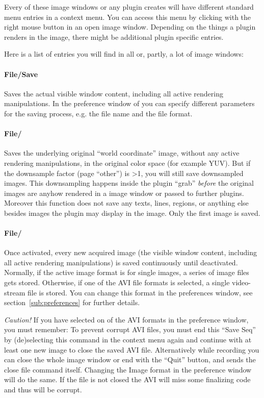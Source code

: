 Every of these image windows \icewing{} or any plugin creates will
have different standard menu entries in a context menu. You can
access this menu by clicking with the right mouse button in an open
image window. Depending on the things a plugin renders in the image,
there might be additional plugin specific entries.

Here is a list of entries you will find in all or, partly, a lot of
image windows:

\paragraph{File/Save}
Saves the actual visible window content, including all active
rendering manipulations. In the preference window of \icewing{} you
can specify different parameters for the saving process, e.g. the
file name and the file format.

\paragraph{File/}
Saves the underlying original ``world coordinate'' image, without
any active rendering manipulations, in the original color space (for
example YUV). But if the downsample factor (page ``other'') is
\textgreater{}1, you will still save downsampled images. This
downsampling happens inside the plugin ``grab'' {\em before} the
original images are anyhow rendered in a image window or passed to
further \icewing{} plugins. Moreover this function does not save any
texts, lines, regions, or anything else besides images the plugin
may display in the image. Only the first image is saved.

\paragraph{File/}
Once activated, every new acquired image (the visible window
content, including all active rendering manipulations) is saved
continuously until deactivated. Normally, if the active image format
is for single images, a series of image files gets
stored. Otherwise, if one of the AVI file formats is selected, a
single video-stream file is stored. You can change this format in
the preferences window, see section~\ref{sub:preferences} for
further details.

{\em Caution!} If you have selected on of the AVI formats in the
preference window, you must remember: To prevent corrupt AVI files,
you must end this ``Save Seq'' by (de)selecting this command in the
context menu again and continue with at least one new image to close
the saved AVI file. Alternatively while recording you can close the
whole image window or end \icewing{} with the ``Quit'' button, and
\icewing{} sends the close file command itself. Changing the Image
format in the preference window will do the same. If the file is not
closed the AVI will miss some finalizing code and thus will be
corrupt.

